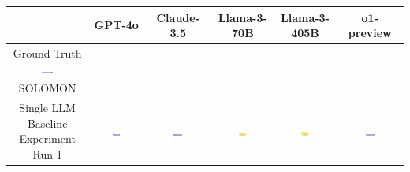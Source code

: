 \begin{table}[H]
    \centering
    \begin{tabular}{|c|c|c|c|c|c|}
    \hline
    & GPT-4o & Claude-3.5 & Llama-3-70B & Llama-3-405B & o1-preview \\
    \hline
    Ground Truth {\includegraphics[width=0.15\textwidth]{examples_png/ViaConnection.png}} & & & & &  \\
    \hline
    SOLOMON & \includegraphics[width=0.15\textwidth]{./pool_all/png/gpt-4o_results/ViaConnection.png} & \includegraphics[width=0.15\textwidth]{./pool_all/png/claude-3-5-sonnet-20240620_results/ViaConnection.png} & \includegraphics[width=0.15\textwidth]{./pool_all/png/watsonx_meta-llama_llama-3-1-70b-instruct_results/ViaConnection.png} & \includegraphics[width=0.15\textwidth]{./pool_all/png/watsonx_meta-llama_llama-3-405b-instruct_results/ViaConnection.png} & \\
    \hline
    Single LLM Baseline Experiment Run 1 & \includegraphics[width=0.15\textwidth]{./run_1/png/gpt-4o_results/ViaConnection.png} & \includegraphics[width=0.15\textwidth]{./run_1/png/claude-3-5-sonnet-20240620_results/ViaConnection.png} & \includegraphics[width=0.15\textwidth]{./run_1/png/watsonx_meta-llama_llama-3-1-70b-instruct_results/ViaConnection.png} & \includegraphics[width=0.15\textwidth]{./run_1/png/watsonx_meta-llama_llama-3-405b-instruct_results/ViaConnection.png} & \includegraphics[width=0.15\textwidth]{./run_1/png/o1-preview_results/ViaConnection.png} \\

\end{tabular}
\end{table}
